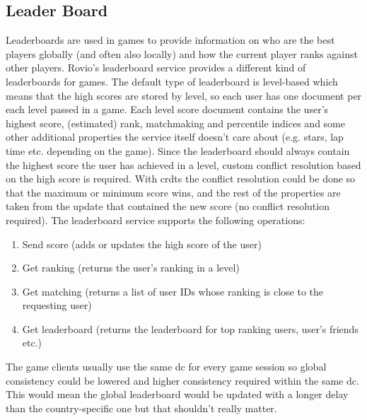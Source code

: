 \subsection{Leader Board}
Leaderboards are used in games to provide information on who are the best players globally (and often also locally) and how the current player ranks against other players. Rovio's leaderboard service provides a different kind of leaderboards for games. The default type of leaderboard is level-based which means that the high scores are stored by level, so each user has one document per each level passed in a game. Each level score document contains the user's highest score, (estimated) rank, matchmaking and percentile indices and some other additional properties the service itself doesn't care about (e.g. stars, lap time etc. depending on the game). Since the leaderboard should always contain the highest score the user has achieved in a level, custom conflict resolution based on the high score is required. With \glspl{crdt} the conflict resolution could be done so that the maximum or minimum score wins, and the rest of the properties are taken from the update that contained the new score (no conflict resolution required). The leaderboard service supports the following operations:
\begin{enumerate}
	\item Send score (adds or updates the high score of the user) 
	\item Get ranking (returns the user's ranking in a level) 
	\item Get matching (returns a list of user IDs whose ranking is close to the requesting user)
	\item Get leaderboard (returns the leaderboard for top ranking users, user's friends etc.)
\end{enumerate}
The game clients usually use the same \gls{dc} for every game session so global consistency could be lowered and higher consistency required within the same \gls{dc}. This would mean the global leaderboard would be updated with a longer delay than the country-specific one but that shouldn't really matter.

